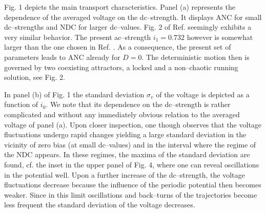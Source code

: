 \documentclass{physeauth}
\begin{document}
Fig. 1 depicts the main transport characteristics. Panel (a) represents
the dependence of the averaged voltage on the dc--strength.
It displays ANC for small dc--strengths and NDC for larger
dc--values. Fig. 2  of Ref. \cite{kosturPRB} seemingly exhibits a very
similar behavior. The present ac--strength $i_1=0.732$ however is
somewhat larger than 
the one chosen in  Ref. \cite{kosturPRB}. As a consequence, the present set of
parameters 
leads to ANC already for $D=0$.  
The deterministic motion then is governed by two coexisting
attractors, a locked and a non--chaotic running solution, see
Fig. 2.  

In panel (b) of Fig. 1 the standard deviation $\sigma_v$ of the voltage 
is depicted as a function of $i_{0}$. We note
that its dependence on the dc--strength is rather complicated and
without any immediately obvious relation to the averaged voltage of panel (a).  
Upon closer
inspection, one though observes that the voltage fluctuations 
undergo rapid changes yielding a large standard deviation
in the vicinity of zero bias (at small dc--values) and in
the interval where the regime of the NDC appears. In these
regimes, the maxima of the standard deviation are found, cf. the inset in the
upper panel of Fig. 4, where one can reveal oscillations in the
potential well.  Upon a further increase of the dc--strength, the
voltage
fluctuations decrease because the influence of the
periodic potential then becomes weaker.  Since in this limit
oscillations and back--turns of the trajectories become less frequent  the
standard deviation of the voltage decreases. 
\end{document}
